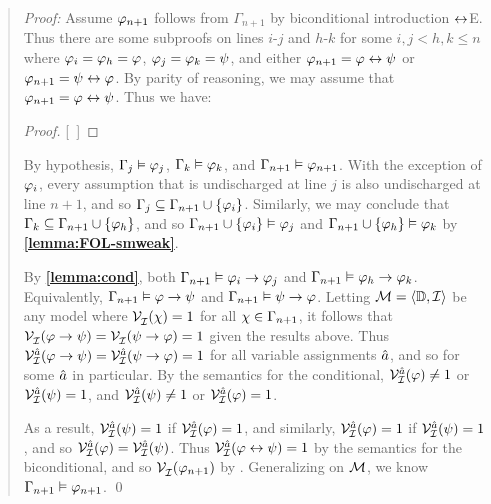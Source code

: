 \begin{quote} 
  \textit{Proof:} Assume $\varphi_{n+1}$ follows from $\Gamma_{n+1}$ by biconditional introduction $\leftrightarrow$E.
  Thus there are some subproofs on lines $i$-$j$ and $h$-$k$ for some $i,j<h,k\leq n$ where $\varphi_i=\varphi_h=\varphi$, $\varphi_j=\varphi_k=\psi$, and either $\varphi_{n+1}=\varphi\leftrightarrow\psi$ or $\varphi_{n+1}=\psi\leftrightarrow\varphi$.
  By parity of reasoning, we may assume that $\varphi_{n+1}=\varphi\leftrightarrow\psi$.
  Thus we have:

  \begin{proof}
    \open
       
    \close
    \open
       
    \close
    [\ ]{\metaA \eiff \metaB} 
  \end{proof}

  By hypothesis, $\Gamma_j\vDash \varphi_j$, $\Gamma_k\vDash \varphi_k$, and $\Gamma_{n+1}\vDash \varphi_{n+1}$.
  With the exception of $\varphi_i$, every assumption that is undischarged at line $j$ is also undischarged at line $n+1$, and so $\Gamma_j\subseteq\Gamma_{n+1}\cup\lbrace\varphi_i\rbrace$.
  Similarly, we may conclude that $\Gamma_k\subseteq\Gamma_{n+1}\cup\lbrace\varphi_h\rbrace$, and so $\Gamma_{n+1}\cup\lbrace\varphi_i\rbrace \vDash \varphi_j$ and $\Gamma_{n+1}\cup\lbrace\varphi_h\rbrace \vDash \varphi_k$ by \textbf{\ref{lemma:FOL-smweak}}.

  By \textbf{\ref{lemma:cond}}, both $\Gamma_{n+1} \vDash \varphi_i \rightarrow \varphi_j$ and $\Gamma_{n+1} \vDash \varphi_h \rightarrow \varphi_k$.
  Equivalently, $\Gamma_{n+1} \vDash \varphi \rightarrow \psi$ and $\Gamma_{n+1} \vDash \psi \rightarrow \varphi$.
  Letting $\mathcal{M}=\langle\mathbb{D},\mathcal{I}\rangle$ be any model where $\mathcal{V}_{\mathcal{I}}^{}(\chi) = 1$ for all $\chi \in \Gamma_{n+1}$, it follows that $\mathcal{V}_{\mathcal{I}}^{}(\varphi \rightarrow \psi) = \mathcal{V}_{\mathcal{I}}^{}(\psi \rightarrow \varphi) = 1$ given the results above.
  Thus $\mathcal{V}_{\mathcal{I}}^{\hat{a}}(\varphi \rightarrow \psi)=\mathcal{V}_{\mathcal{I}}^{\hat{a}}(\psi \rightarrow \varphi)=1$ for all variable assignments $\hat{a}$, and so for some $\hat{a}$ in particular. 
  By the semantics for the conditional, $\mathcal{V}_{\mathcal{I}}^{\hat{a}}(\varphi)\neq 1$ or $\mathcal{V}_{\mathcal{I}}^{\hat{a}}(\psi)=1$, and $\mathcal{V}_{\mathcal{I}}^{\hat{a}}(\psi)\neq 1$ or $\mathcal{V}_{\mathcal{I}}^{\hat{a}}(\varphi)=1$.

  As a result, $\mathcal{V}_{\mathcal{I}}^{\hat{a}}(\psi)=1$ if $\mathcal{V}_{\mathcal{I}}^{\hat{a}}(\varphi)=1$, and similarly, $\mathcal{V}_{\mathcal{I}}^{\hat{a}}(\varphi)=1$ if $\mathcal{V}_{\mathcal{I}}^{\hat{a}}(\psi)=1$, and so $\mathcal{V}_{\mathcal{I}}^{\hat{a}}(\varphi)=\mathcal{V}_{\mathcal{I}}^{\hat{a}}(\psi)$.
  Thus $\mathcal{V}_{\mathcal{I}}^{\hat{a}}(\varphi \leftrightarrow \psi)=1$ by the semantics for the biconditional, and so $\mathcal{V}_{\mathcal{I}}^{}(\varphi_{n+1})$ by .
  Generalizing on $\mathcal{M}$, we know $\Gamma_{n+1}\vDash\varphi_{n+1}$.
  \qed
\end{quote}





